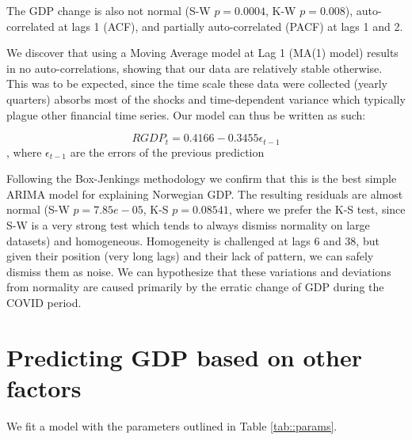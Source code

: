 \documentclass[11pt, a4paper]{article}
\begin{document}
	The GDP change is also not normal (S-W $p = 0.0004$, K-W $p = 0.008$), auto-correlated at lags 1 (ACF), and partially auto-correlated (PACF) at lags 1 and 2.
	
	We discover that using a Moving Average model at Lag 1 (MA(1) model) results in no auto-correlations, showing that our data are relatively stable otherwise. This was to be expected, since the time scale these data were collected (yearly quarters) absorbs most of the shocks and time-dependent variance which typically plague other financial time series. Our model can thus be written as such:
	
	$$
	RGDP_t = 0.4166 -0.3455 \epsilon_{t-1}
	$$, where $\epsilon_{t-1}$ are the errors of the previous prediction
	
	Following the Box-Jenkings methodology we confirm that this is the best simple ARIMA model for explaining Norwegian GDP. The resulting residuals are almost normal (S-W $p=7.85e-05$, K-S $p=0.08541$, where we prefer the K-S test, since S-W is a very strong test which tends to always dismiss normality on large datasets) and homogeneous. Homogeneity is challenged at lags 6 and 38, but given their position (very long lags) and their lack of pattern, we can safely dismiss them as noise. We can hypothesize that these variations and deviations from normality are caused primarily by the erratic change of GDP during the COVID period.
	
	
	\section{Predicting GDP based on other factors}
	
	We fit a model with the parameters outlined in Table \ref{tab::params}.
	
\end{document}
